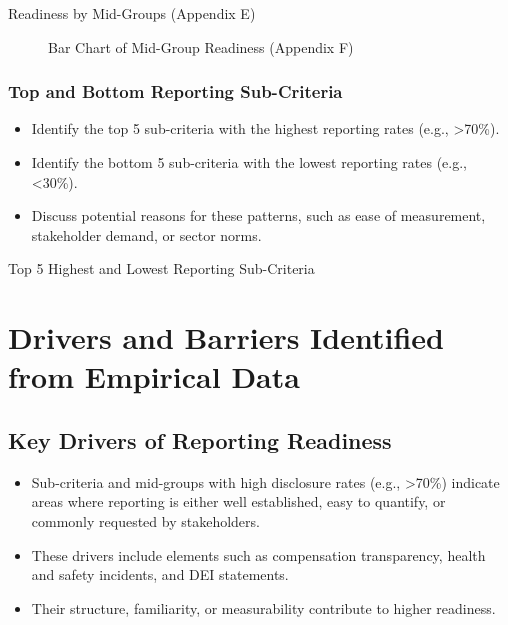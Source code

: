 \begin{table}[H]
    \centering
    \caption{Readiness by Mid-Groups (Appendix E)}
\end{table}

\begin{figure}[H]
    \centering
    \caption{Bar Chart of Mid-Group Readiness (Appendix F)}
\end{figure}

\subsubsection{Top and Bottom Reporting Sub-Criteria}
\begin{itemize}
    \item Identify the top 5 sub-criteria with the highest reporting rates (e.g., >70\%).
    \item Identify the bottom 5 sub-criteria with the lowest reporting rates (e.g., <30\%).
    \item Discuss potential reasons for these patterns, such as ease of measurement, stakeholder demand, or sector norms.
\end{itemize}

\begin{table}[H]
    \centering
    \caption{Top 5 Highest and Lowest Reporting Sub-Criteria}
\end{table}

\section{Drivers and Barriers Identified from Empirical Data}
\subsection{Key Drivers of Reporting Readiness}
\begin{itemize}
    \item Sub-criteria and mid-groups with high disclosure rates (e.g., >70\%) 
    indicate areas where reporting is either well established, easy to quantify, or commonly requested by stakeholders. 
    \item These drivers include elements such as compensation transparency, health and safety incidents, and DEI statements. 
    \item Their structure, familiarity, or measurability contribute to higher readiness.
\end{itemize}

